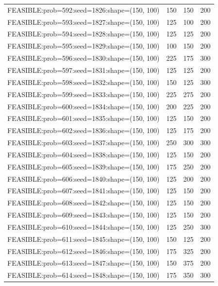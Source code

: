 \begin{longtable}{lccc}
FEASIBLE:prob=592:seed=1826:shape=(150, 100) &      150 &   150 &    200 \\
FEASIBLE:prob=593:seed=1827:shape=(150, 100) &      125 &   100 &    200 \\
FEASIBLE:prob=594:seed=1828:shape=(150, 100) &      125 &   125 &    200 \\
FEASIBLE:prob=595:seed=1829:shape=(150, 100) &      100 &   150 &    200 \\
FEASIBLE:prob=596:seed=1830:shape=(150, 100) &      225 &   175 &    300 \\
FEASIBLE:prob=597:seed=1831:shape=(150, 100) &      125 &   125 &    200 \\
FEASIBLE:prob=598:seed=1832:shape=(150, 100) &      150 &   125 &    300 \\
FEASIBLE:prob=599:seed=1833:shape=(150, 100) &      225 &   275 &    200 \\
FEASIBLE:prob=600:seed=1834:shape=(150, 100) &      200 &   225 &    200 \\
FEASIBLE:prob=601:seed=1835:shape=(150, 100) &      125 &   150 &    200 \\
FEASIBLE:prob=602:seed=1836:shape=(150, 100) &      125 &   175 &    200 \\
FEASIBLE:prob=603:seed=1837:shape=(150, 100) &      250 &   300 &    300 \\
FEASIBLE:prob=604:seed=1838:shape=(150, 100) &      125 &   150 &    200 \\
FEASIBLE:prob=605:seed=1839:shape=(150, 100) &      175 &   250 &    200 \\
FEASIBLE:prob=606:seed=1840:shape=(150, 100) &      125 &   200 &    200 \\
FEASIBLE:prob=607:seed=1841:shape=(150, 100) &      125 &   150 &    200 \\
FEASIBLE:prob=608:seed=1842:shape=(150, 100) &      125 &   150 &    200 \\
FEASIBLE:prob=609:seed=1843:shape=(150, 100) &      125 &   150 &    200 \\
FEASIBLE:prob=610:seed=1844:shape=(150, 100) &      125 &   250 &    300 \\
FEASIBLE:prob=611:seed=1845:shape=(150, 100) &      150 &   125 &    200 \\
FEASIBLE:prob=612:seed=1846:shape=(150, 100) &      175 &   325 &    200 \\
FEASIBLE:prob=613:seed=1847:shape=(150, 100) &      150 &   375 &    200 \\
FEASIBLE:prob=614:seed=1848:shape=(150, 100) &      175 &   350 &    300 \\

\end{longtable}
